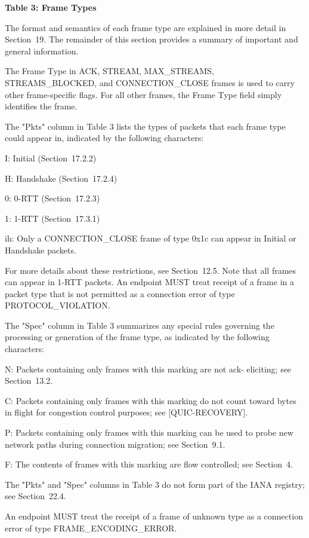\documentclass{article}
\begin{document}
\begin{center}
\textbf{Table 3: Frame Types}
\end{center}

The format and semantics of each frame type are explained in more detail in Section~19.  The remainder of this section provides a summary of important and general information.

The Frame Type in ACK, STREAM, MAX\_STREAMS, STREAMS\_BLOCKED, and CONNECTION\_CLOSE frames is used to carry other frame-specific flags. For all other frames, the Frame Type field simply identifies the frame.

The "Pkts" column in Table 3 lists the types of packets that each frame type could appear in, indicated by the following characters:

I:   Initial (Section~17.2.2)

H:   Handshake (Section~17.2.4)

0:   0-RTT (Section~17.2.3)

1:   1-RTT (Section~17.3.1)

ih:  Only a CONNECTION\_CLOSE frame of type 0x1c can appear in Initial or Handshake packets.

For more details about these restrictions, see Section~12.5.  Note that all frames can appear in 1-RTT packets.  An endpoint MUST treat receipt of a frame in a packet type that is not permitted as a connection error of type PROTOCOL\_VIOLATION.

The "Spec" column in Table 3 summarizes any special rules governing the processing or generation of the frame type, as indicated by the following characters:

N:   Packets containing only frames with this marking are not ack- eliciting; see Section~13.2.

C:   Packets containing only frames with this marking do not count toward bytes in flight for congestion control purposes; see [QUIC-RECOVERY].

P:   Packets containing only frames with this marking can be used to probe new network paths during connection migration; see Section~9.1.

F:   The contents of frames with this marking are flow controlled; see Section~4.

The "Pkts" and "Spec" columns in Table 3 do not form part of the IANA registry; see Section~22.4.

An endpoint MUST treat the receipt of a frame of unknown type as a connection error of type FRAME\_ENCODING\_ERROR.
\end{document}
